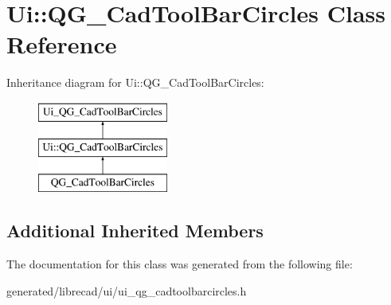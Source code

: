 \hypertarget{classUi_1_1QG__CadToolBarCircles}{\section{Ui\-:\-:Q\-G\-\_\-\-Cad\-Tool\-Bar\-Circles Class Reference}
\label{classUi_1_1QG__CadToolBarCircles}
}
Inheritance diagram for Ui\-:\-:Q\-G\-\_\-\-Cad\-Tool\-Bar\-Circles\-:\begin{figure}[H]
\begin{center}
\leavevmode
\includegraphics[height=3.000000cm]{classUi_1_1QG__CadToolBarCircles}
\end{center}
\end{figure}
\subsection*{Additional Inherited Members}


The documentation for this class was generated from the following file\-:\begin{DoxyCompactItemize}
\item 
generated/librecad/ui/ui\-\_\-qg\-\_\-cadtoolbarcircles.\-h\end{DoxyCompactItemize}
